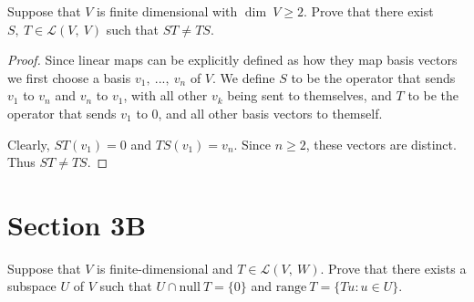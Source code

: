 \documentclass[10pt, oneside]{article}
\newenvironment{problem}[2][Problem]{\begin{trivlist}
\item[\hskip \labelsep {\bfseries #1}\hskip \labelsep {\bfseries #2.}]}{\end{trivlist}}
\begin{document}
    \begin{problem}{3.14}
          Suppose that $V$ is finite dimensional with $\dim \ V \geq 2$. Prove that there exist $S, \ T \in \mathcal{L}(V, \ V)$ such that $ST \neq TS$.
    \end{problem}

    \begin{proof}
      Since linear maps can be explicitly defined as how they map basis vectors we first choose a basis $v_1, \ ..., \ v_n$ of $V$. We define $S$ to be the operator that sends $v_1$ to $v_n$ and
      $v_n$ to $v_1$, with all other $v_k$ being sent to themselves, and $T$ to be the operator that sends $v_1$ to $0$, and all other basis vectors to themself.
      \newline

      Clearly, $ST(v_1) = 0$ and $TS(v_1) = v_n$. Since $n \geq 2$, these vectors are distinct. Thus $ST \neq TS$.
      \end{proof}

    \section{Section 3B}

    \begin{problem}{3.12}


      Suppose that $V$ is finite-dimensional and $T \in \mathcal{L}(V, \ W)$. Prove that there exists a subspace
      $U$ of $V$ such that $U \cap \text{null} \ T = \{0\}$ and $\text{range} \ T = \{Tu : u \in U\}$.

      \end{problem}
\end{document}
